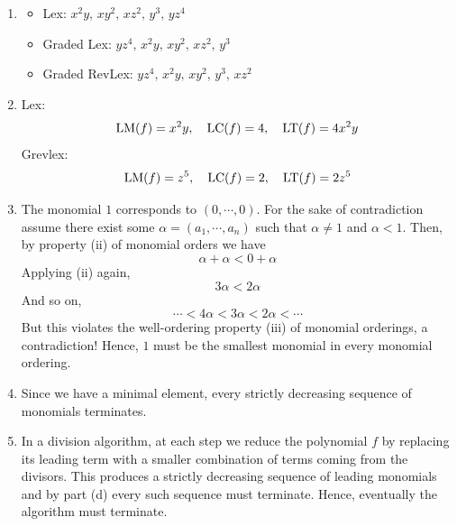 \documentclass[Notebook.tex]{subfiles}
\begin{document}
\begin{solution}
    \bbni
    \begin{enumerate}[label=(\alph*),ref=\theenumi\alph*]
        \item 
        \begin{itemize}
            \item Lex: $x^2y, \, xy^2, \, xz^2, \,  y^3, \, yz^4$
            \item Graded Lex: $yz^4, \, x^2y, \, xy^2, \, xz^2, \,  y^3$
            \item Graded RevLex: $yz^4, \, x^2y, \, xy^2, \, y^3, \,  xz^2$
        \end{itemize}

        \item Lex:
            \[\text{LM}(f) = x^2y, \quad \text{LC}(f) = 4, \quad \text{LT}(f) = 4x^2y\]
            Grevlex: 
            \[\text{LM}(f) = z^5, \quad \text{LC}(f) = 2, \quad \text{LT}(f) = 2z^5\]
        
        \item The monomial $1$ corresponds to $(0, \cdots, 0)$. For the sake of contradiction assume there exist some $\alpha = (a_1, \cdots, a_n)$ such that $\alpha \neq 1$ and $\alpha < 1$. Then, by property (ii) of monomial orders we have 
        \[\alpha + \alpha < 0 + \alpha \]
        Applying (ii) again, 
        \[3\alpha  < 2\alpha \]
        And so on, 
        \[\cdots < 4 \alpha < 3\alpha  < 2\alpha  < \cdots\]
        But this violates the well-ordering property (iii) of monomial orderings, a contradiction! Hence, $1$ must be the smallest monomial in every monomial ordering. 

        \item Since we have a minimal element, every strictly decreasing sequence of monomials terminates.
        
        \item  In a division algorithm, at each step we reduce the polynomial $f$ by replacing its leading term with a smaller combination of terms coming from the divisors. This produces a strictly decreasing sequence of leading monomials and by part (d) every such sequence must terminate. Hence, eventually the algorithm must terminate. 
    \end{enumerate}
\end{solution}

\newpage
\end{document}
